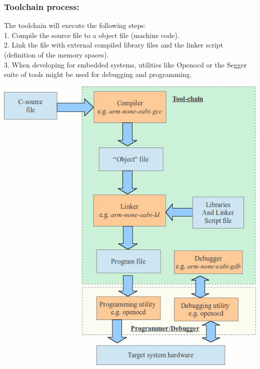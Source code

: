 \documentclass{beamer}
\begin{document}
\begin{frame}
\frametitle{Toolchain process:}

\begin{multicols}{2}[]
The toolchain will execute the following steps: \\
1. Compile the source file to a object file (machine code).\\
2. Link the file with external compiled library files and the linker script (definition of the memory spaces).\\
3. When developing for embedded systems, utilities like Openocd or the Segger suite of tools might be used for debugging and programming.

\includegraphics[width=\linewidth]{figures/toolchain_overview.jpg}
\end{multicols}
\end{frame}
\end{document}
